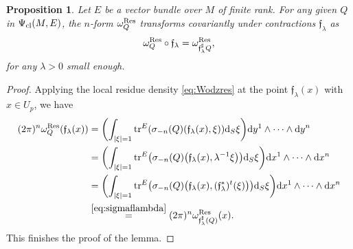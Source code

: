 \documentclass[pdftex]{sigma}
\numberwithin{equation}{section}
\newtheorem{prop}[thm]{Proposition}
\theoremstyle{definition}
\def \bui#1#2{\mathrel{\mathop{\kern 0pt#1}\limits^{#2}}}
\begin{document}
\begin{prop} \label{prop:flambdasharpA} Let $E$ be a vector bundle over $M$ of finite rank. For any given $Q$ in $\Psi_{\rm cl}(M,E)$, the $n$-form $\omega^{\rm Res}_Q $ transforms covariantly under contractions ${\mathfrak f}_\lambda$ as
\begin{equation*}
\omega_Q^{\rm Res}\circ{\mathfrak f}_\lambda =\omega^{\rm Res}_{{\mathfrak f}_\lambda^\sharp Q},
\end{equation*}
for any $\lambda>0$ small enough.
\end{prop}
 \begin{proof} Applying the local residue density \eqref{eq:Wodzres} at the point $\mathfrak{f}_\lambda(x)$ {with $x\in U_p$}, we have
\begin{align*} 	
(2\pi)^n\omega_Q^{{ {\rm Res}}}({\mathfrak f}_{ \lambda}(x))
&= \biggl( \int_{\vert \xi\vert=1} {\rm tr}^E(\sigma_{ {-n}}({ Q})({ { {\mathfrak f}}_{ \lambda}(x)}, \xi)) {\rm d}_S\xi\biggr) {\rm d}{ y^1}\wedge \dots \wedge {\rm d}{y^n} \\
&= \biggl( \int_{\vert \xi\vert=1}{\rm tr}^E\bigl( \sigma_{ {-n}}({Q})\bigl({ { {\mathfrak f}}_{ \lambda}(x)},{ \lambda}^{ -1} \xi\bigr)\bigr) {\rm d}_S\xi\biggr) {\rm d}{ x}^1\wedge \dots \wedge {\rm d}{x}^n \\
&= \biggl( \int_{\vert \xi\vert=1} {\rm tr}^E\bigl(\sigma_{ {-n}}({ Q})\bigl({ { {\mathfrak f}}_{ \lambda}(x)}, ({\mathfrak f}_{ \lambda}^*)^t (\xi)\bigr)\bigr) {\rm d}_S\xi\biggr) {\rm d}{ x}^1\wedge \dots \wedge {\rm d}{x}^n \\
&\bui{=}{\eqref{eq:sigmaflambda}} (2\pi)^n \omega^{ {\rm Res}}_{{ {\mathfrak f}}_{ \lambda}^\sharp (Q)}(x).
\end{align*}
This finishes the proof of the lemma.
\end{proof}
\end{document}
